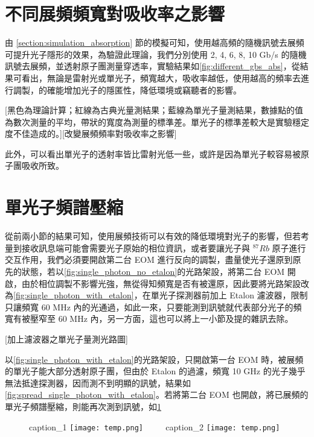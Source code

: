 \documentclass[class=NCU_thesis, crop=false]{standalone}
\begin{document}
\section{不同展頻頻寬對吸收率之影響}
由 \ref{section:simulation_absorption} 節的模擬可知，使用越高頻的隨機訊號去展頻可提升光子隱形的效果，為驗證此理論，我們分別使用 2, 4, 6, 8, 10 Gb/s 的隨機訊號去展頻，並透射原子團測量穿透率，實驗結果如\cref{fig:different_gbs_abs}，從結果可看出，無論是雷射光或單光子，頻寬越大，吸收率越低，使用越高的頻率去進行調製，的確能增加光子的隱匿性，降低環境或竊聽者的影響。

[黑色為理論計算；紅線為古典光量測結果；藍線為單光子量測結果，數據點的值為數次測量的平均，帶狀的寬度為測量的標準差。單光子的標準差較大是實驗穩定度不佳造成的。][改變展頻頻率對吸收率之影響]

此外，可以看出單光子的透射率皆比雷射光低一些，或許是因為單光子較容易被原子團吸收所致。

\section{單光子頻譜壓縮}

從前兩小節的結果可知，使用展頻技術可以有效的降低環境對光子的影響，但若考量到接收訊息端可能會需要光子原始的相位資訊，或者要讓光子與 $^{87}Rb$ 原子進行交互作用，我們必須要開啟第二台 EOM 進行反向的調製，盡量使光子還原到原先的狀態，若以\cref{fig:single_photon_no_etalon}的光路架設，將第二台 EOM 開啟，由於相位調製不影響光強，無從得知頻寬是否有被還原，因此要將光路架設改為\cref{fig:single_photon_with_etalon}，在單光子探測器前加上 Etalon 濾波器，限制只讓頻寬 60 MHz 內的光通過，如此一來，只要能測到訊號就代表部分光子的頻寬有被壓窄至 60 MHz 內，另一方面，這也可以將上一小節及提的雜訊去除。

[加上濾波器之單光子量測光路圖]

以\cref{fig:single_photon_with_etalon}的光路架設，只開啟第一台 EOM 時，被展頻的單光子能大部分透射原子團，但由於 Etalon 的過濾，頻寬 10 GHz 的光子幾乎無法抵達探測器，因而測不到明顯的訊號，結果如\cref{fig:spread_single_photon_with_etalon}。若將第二台 EOM 也開啟，將已展頻的單光子頻譜壓縮，則能再次測到訊號，如\cref{fig:compress_single_photon_with_etalon}

\begin{figure}[!hbt]
    \centering
    \subcaptionbox
        {caption\_1
        \label{fig:spread_single_photon_with_etalon}}
        {\texttt{[image: temp.png]}}
    ~~~~
    \subcaptionbox
        {caption\_2
        \label{fig:compress_single_photon_with_etalon}}
        {\texttt{[image: temp.png]}}
\end{figure}
\end{document}
